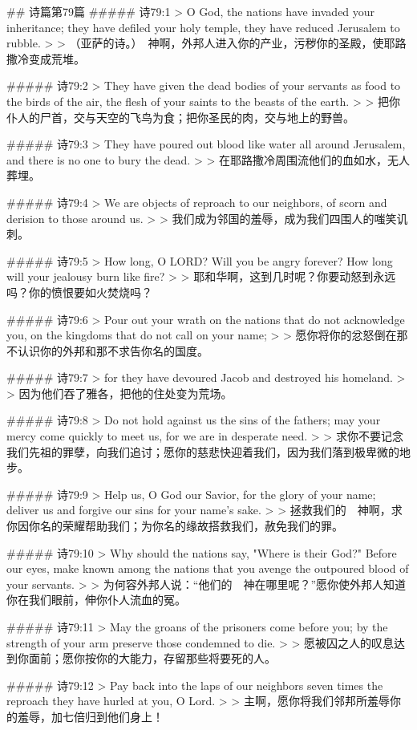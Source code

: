 ## 诗篇第79篇
##### 诗79:1
> O God, the nations have invaded your inheritance; they have defiled your holy temple, they have reduced Jerusalem to rubble.
>
> （亚萨的诗。）　神啊，外邦人进入你的产业，污秽你的圣殿，使耶路撒冷变成荒堆。


##### 诗79:2
> They have given the dead bodies of your servants as food to the birds of the air, the flesh of your saints to the beasts of the earth.
>
> 把你仆人的尸首，交与天空的飞鸟为食；把你圣民的肉，交与地上的野兽。


##### 诗79:3
> They have poured out blood like water all around Jerusalem, and there is no one to bury the dead.
>
> 在耶路撒冷周围流他们的血如水，无人葬埋。


##### 诗79:4
> We are objects of reproach to our neighbors, of scorn and derision to those around us.
>
> 我们成为邻国的羞辱，成为我们四围人的嗤笑讥刺。


##### 诗79:5
> How long, O LORD? Will you be angry forever? How long will your jealousy burn like fire?
>
> 耶和华啊，这到几时呢？你要动怒到永远吗？你的愤恨要如火焚烧吗？


##### 诗79:6
> Pour out your wrath on the nations that do not acknowledge you, on the kingdoms that do not call on your name;
>
> 愿你将你的忿怒倒在那不认识你的外邦和那不求告你名的国度。


##### 诗79:7
> for they have devoured Jacob and destroyed his homeland.
>
> 因为他们吞了雅各，把他的住处变为荒场。


##### 诗79:8
> Do not hold against us the sins of the fathers; may your mercy come quickly to meet us, for we are in desperate need.
>
> 求你不要记念我们先祖的罪孽，向我们追讨；愿你的慈悲快迎着我们，因为我们落到极卑微的地步。


##### 诗79:9
> Help us, O God our Savior, for the glory of your name; deliver us and forgive our sins for your name's sake.
>
> 拯救我们的　神啊，求你因你名的荣耀帮助我们；为你名的缘故搭救我们，赦免我们的罪。


##### 诗79:10
> Why should the nations say, "Where is their God?" Before our eyes, make known among the nations that you avenge the outpoured blood of your servants.
>
> 为何容外邦人说：“他们的　神在哪里呢？”愿你使外邦人知道你在我们眼前，伸你仆人流血的冤。


##### 诗79:11
> May the groans of the prisoners come before you; by the strength of your arm preserve those condemned to die.
>
> 愿被囚之人的叹息达到你面前；愿你按你的大能力，存留那些将要死的人。


##### 诗79:12
> Pay back into the laps of our neighbors seven times the reproach they have hurled at you, O Lord.
>
> 主啊，愿你将我们邻邦所羞辱你的羞辱，加七倍归到他们身上！


